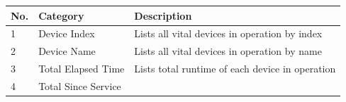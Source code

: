 \begin{longtable}[]{@{}|l|l|l|@{}}
\toprule
\rowcolor{brown}\begin{minipage}[b]{0.04\columnwidth}\raggedright
{\bf{No.}}\strut
\end{minipage} & \begin{minipage}[b]{0.23\columnwidth}\raggedright
{\bf{Category}}\strut
\end{minipage} & \begin{minipage}[b]{0.65\columnwidth}\raggedright
{\bf{Description}}\strut
\end{minipage}\tabularnewline
\midrule
\endhead
\begin{minipage}[t]{0.04\columnwidth}\raggedright
1\strut
\end{minipage} & \begin{minipage}[t]{0.23\columnwidth}\raggedright
Device Index\strut
\end{minipage} & \begin{minipage}[t]{0.65\columnwidth}\raggedright
Lists all vital devices in operation by index\strut
\end{minipage}\tabularnewline
\begin{minipage}[t]{0.04\columnwidth}\raggedright
2\strut
\end{minipage} & \begin{minipage}[t]{0.23\columnwidth}\raggedright
Device Name\strut
\end{minipage} & \begin{minipage}[t]{0.65\columnwidth}\raggedright
Lists all vital devices in operation by name\strut
\end{minipage}\tabularnewline
\begin{minipage}[t]{0.04\columnwidth}\raggedright
3\strut
\end{minipage} & \begin{minipage}[t]{0.23\columnwidth}\raggedright
Total Elapsed Time\strut
\end{minipage} & \begin{minipage}[t]{0.65\columnwidth}\raggedright
Lists total runtime of each device in operation\strut
\end{minipage}\tabularnewline
\begin{minipage}[t]{0.04\columnwidth}\raggedright
4\strut
\end{minipage} & \begin{minipage}[t]{0.23\columnwidth}\raggedright
Total Since Service\strut
\end{minipage} & \begin{minipage}[t]{0.65\columnwidth}\raggedright

\end{minipage}
\end{longtable}
